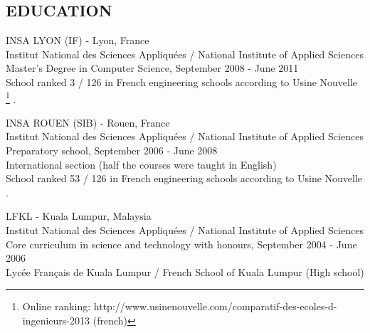 \documentclass[11pt]{res} %
\newcommand{\footnoteremember}[2]{
\footnote{#2}
\newcounter{#1}
\setcounter{#1}{\value{footnote}}
}
\newcommand{\footnoterecall}[1]{
\footnotemark[\value{#1}]
}
\begin{document}
 
 
\address{5 rue du boulevard \\  69100, Villeurbanne\\ France \\ (+33) 6 80 90 78 17}

                                             
\begin{resume}
 
\section{EDUCATION} 
 \noindent INSA LYON (IF) - Lyon, France \\
Institut National des Sciences Appliqu\'ees / National Institute of Applied Sciences\\
Master's Degree in Computer Science, September 2008 - June 2011 \\
School ranked 3 / 126 in French engineering schools according to Usine Nouvelle\footnoteremember{usine_nouvelle}{Online ranking: http://www.usinenouvelle.com/comparatif-des-ecoles-d-ingenieurs-2013 (french)}.

 \noindent INSA ROUEN (SIB) - Rouen, France \\
Institut National des Sciences Appliqu\'ees / National Institute of Applied Sciences\\
Preparatory school, September 2006 - June 2008 \\
International section (half the courses were taught in English) \\
School ranked 53 / 126 in French engineering schools according to Usine Nouvelle\footnoterecall{usine_nouvelle}.

 \noindent LFKL - Kuala Lumpur, Malaysia \\
Institut National des Sciences Appliquées / National Institute of Applied Sciences\\
Core curriculum in science and technology with honours, September 2004 - June 2006 \\
Lyc\'ee Français de Kuala Lumpur / French School of Kuala Lumpur (High school)


\end{resume}
\end{document}
